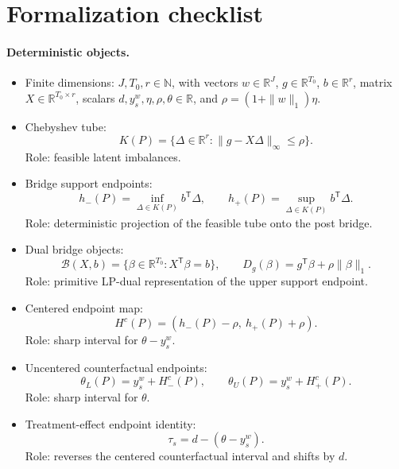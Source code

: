 \documentclass[11pt]{article}
\newcommand{\transpose}{\mathsf{T}}
\newcommand{\R}{\mathbb{R}}
\theoremstyle{definition}
\theoremstyle{plain}
\theoremstyle{remark}
\begin{document}
\section{Formalization checklist}
\paragraph{Deterministic objects.}
\begin{itemize}[leftmargin=*]
\item Finite dimensions: \(J,T_0,r\in\mathbb N\), with vectors
\(w\in\R^J\), \(g\in\R^{T_0}\), \(b\in\R^r\), matrix
\(X\in\R^{T_0\times r}\), scalars \(d,y_s^w,\eta,\rho,\theta\in\R\), and
\(\rho=(1+\|w\|_1)\eta\).
\item Chebyshev tube:
\[
K(P)=\{\Delta\in\R^r:\|g-X\Delta\|_\infty\le\rho\}.
\]
Role: feasible latent imbalances.
\item Bridge support endpoints:
\[
h_-(P)=\inf_{\Delta\in K(P)}b^\transpose\Delta,\qquad
h_+(P)=\sup_{\Delta\in K(P)}b^\transpose\Delta.
\]
Role: deterministic projection of the feasible tube onto the post bridge.
\item Dual bridge objects:
\[
\mathcal B(X,b)=\{\beta\in\R^{T_0}:X^\transpose\beta=b\},\qquad
D_g(\beta)=g^\transpose\beta+\rho\|\beta\|_1.
\]
Role: primitive LP-dual representation of the upper support endpoint.
\item Centered endpoint map:
\[
H^c(P)=(h_-(P)-\rho,\ h_+(P)+\rho).
\]
Role: sharp interval for \(\theta-y_s^w\).
\item Uncentered counterfactual endpoints:
\[
\theta_L(P)=y_s^w+H^c_-(P),\qquad
\theta_U(P)=y_s^w+H^c_+(P).
\]
Role: sharp interval for \(\theta\).
\item Treatment-effect endpoint identity:
\[
\tau_s=d-(\theta-y_s^w).
\]
Role: reverses the centered counterfactual interval and shifts by \(d\).
\end{itemize}
\end{document}
